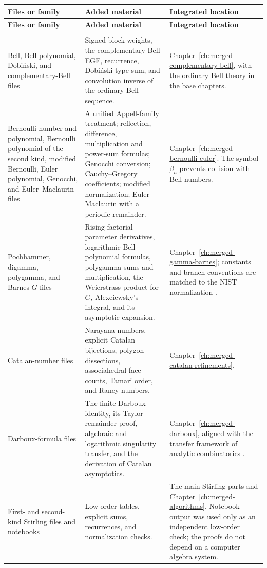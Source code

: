 \documentclass[11pt,a4paper,oneside,openany]{book}
\theoremstyle{definition}
\theoremstyle{remark}
\begin{document}
\renewcommand{\arraystretch}{1.15}
\begin{longtable}{>{\raggedright\arraybackslash}p{}
                  >{\raggedright\arraybackslash}p{}
                  >{\raggedright\arraybackslash}p{}}
\toprule
\textbf{Files or family} & \textbf{Added material} & \textbf{Integrated location}\\
\midrule
\endfirsthead
\toprule
\textbf{Files or family} & \textbf{Added material} & \textbf{Integrated location}\\
\midrule
\endhead
\midrule
\multicolumn{3}{r}{\small Continued on the next page}\\
\endfoot
\bottomrule
\endlastfoot

Bell, Bell polynomial, Dobi\'nski, and complementary-Bell files
& Signed block weights, the complementary Bell EGF, recurrence, Dobi\'nski-type
  sum, and convolution inverse of the ordinary Bell sequence.
& Chapter~\ref{ch:merged-complementary-bell}, with the ordinary Bell theory in the
  base chapters.\\[1ex]

Bernoulli number and polynomial, Bernoulli polynomial of the second kind,
modified Bernoulli, Euler polynomial, Genocchi, and Euler--Maclaurin files
& A unified Appell-family treatment; reflection, difference, multiplication and
  power-sum formulas; Genocchi conversion; Cauchy--Gregory coefficients; modified
  normalization; Euler--Maclaurin with a periodic remainder.
& Chapter~\ref{ch:merged-bernoulli-euler}.  The symbol $\beta_n$ prevents collision
  with Bell numbers.\\[1ex]

Pochhammer, digamma, polygamma, and Barnes $G$ files
& Rising-factorial parameter derivatives, logarithmic Bell-polynomial formulas,
  polygamma sums and multiplication, the Weierstrass product for $G$, Alexeiewsky's
  integral, and its asymptotic expansion.
& Chapter~\ref{ch:merged-gamma-barnes}; constants and branch conventions are
  matched to the NIST normalization \cite{NISTDLMF}.\\[1ex]

Catalan-number files
& Narayana numbers, explicit Catalan bijections, polygon dissections, associahedral
  face counts, Tamari order, and Raney numbers.
& Chapter~\ref{ch:merged-catalan-refinements}.\\[1ex]

Darboux-formula files
& The finite Darboux identity, its Taylor-remainder proof, algebraic and logarithmic
  singularity transfer, and the derivation of Catalan asymptotics.
& Chapter~\ref{ch:merged-darboux}, aligned with the transfer framework of
  analytic combinatorics \cite{FlajoletSedgewick2009}.\\[1ex]

First- and second-kind Stirling files and notebooks
& Low-order tables, explicit sums, recurrences, and normalization checks.
& The main Stirling parts and Chapter~\ref{ch:merged-algorithms}.  Notebook output
  was used only as an independent low-order check; the proofs do not depend on a
  computer algebra system.\\
\end{longtable}
\renewcommand{\arraystretch}{1}
\end{document}
